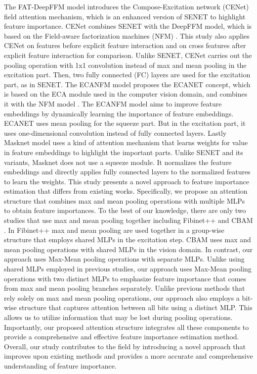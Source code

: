 \documentclass{article}
\begin{document}
The FAT-DeepFFM model \cite{zhang2019fat} introduces the Compose-Excitation network (CENet) field attention mechanism, which is an enhanced version of SENET to highlight feature importance. CENet combines SENET with the DeepFFM model, which is based on the Field-aware factorization machines (NFM) \cite{juan2017field}. This study also applies CENet on features before explicit feature interaction and on cross features after explicit feature interaction for comparison. Unlike SENET, CENet carries out the pooling operation with 1x1 convolution instead of max and mean pooling in the excitation part. Then, two fully connected (FC) layers are used for the excitation part, as in SENET.
The ECANFM model \cite{shi2021ctr} proposes the ECANET concept, which is based on the ECA module used in the computer vision domain, and combines it with the NFM model \cite{he2017neural}. The ECANFM model aims to improve feature embeddings by dynamically learning the importance of feature embeddings. ECANET uses mean pooling for the squeeze part. But in the excitation part, it uses one-dimensional convolution instead of fully connected layers.
Lastly Masknet model \cite{wang2021masknet} uses a kind of attention mechanism that learns weights for value in feature embeddings to highlight the important parts. Unlike SENET and its variants, Masknet does not use a squeeze module. It normalizes the feature embeddings and directly applies fully connected layers to the normalized features to learn the weights.
This study presents a novel approach to feature importance estimation that differs from existing works. Specifically, we propose an attention structure that combines max and mean pooling operations with multiple MLPs to obtain feature importances. To the best of our knowledge, there are only two studies that use max and mean pooling together including Fibinet++ \cite{zhang2022fibinet++} and CBAM \cite{woo2018cbam}. In Fibinet++ max and mean pooling are used together in a group-wise structure that employs shared MLPs in the excitation step. CBAM uses max and mean pooling operations with shared MLPs in the vision domain. In contrast, our approach uses Max-Mean pooling operations with separate MLPs. Unlike using shared MLPs employed in previous studies, our approach uses Max-Mean pooling operations with two distinct MLPs to emphasize feature importance that comes from max and mean pooling branches separately. Unlike previous methods that rely solely on max and mean pooling operations, our approach also employs a bit-wise structure that captures attention between all bits using a distinct MLP. This allows us to utilize information that may be lost during pooling operations. Importantly, our proposed attention structure integrates all these components to provide a comprehensive and effective feature importance estimation method. Overall, our study contributes to the field by introducing a novel approach that improves upon existing methods and provides a more accurate and comprehensive understanding of feature importance.
\end{document}
